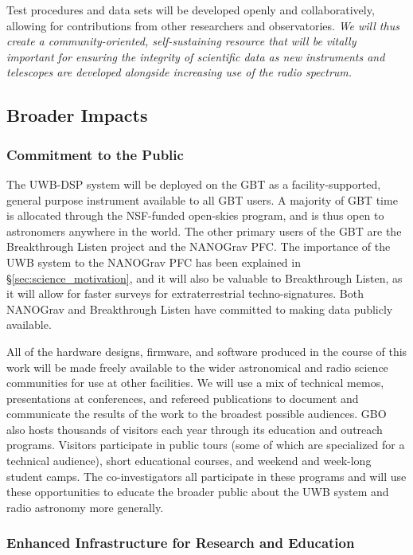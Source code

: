 \documentclass[10pt]{myNSF}
\begin{document}
Test procedures and data sets will be developed openly and
collaboratively, allowing for contributions from other researchers and
observatories.  \emph{We will thus create a community-oriented,
  self-sustaining resource that will be vitally important for ensuring
  the integrity of scientific data as new instruments and telescopes
  are developed alongside increasing use of the radio spectrum.}

\subsection{Broader Impacts}
\label{sec:BI}

\subsubsection{Commitment to the Public}
\label{sec:commitment}

The UWB-DSP system will be deployed on the GBT as a
facility-supported, general purpose instrument available to all GBT
users.  A majority of GBT time is allocated through the NSF-funded
open-skies program, and is thus open to astronomers anywhere in the
world.  The other primary users of the GBT are the Breakthrough Listen
project and the NANOGrav PFC.  The importance of the UWB system to the
NANOGrav PFC has been explained in \S\ref{sec:science_motivation}, and
it will also be valuable to Breakthrough Listen, as it will allow for
faster surveys for extraterrestrial techno-signatures.  Both NANOGrav
and Breakthrough Listen have committed to making data publicly
available.

All of the hardware designs, firmware, and software produced in the
course of this work will be made freely available to the wider
astronomical and radio science communities for use at other
facilities.  We will use a mix of technical memos, presentations at
conferences, and refereed publications to document and communicate the
results of the work to the broadest possible audiences.  GBO also
hosts thousands of visitors each year through its education and
outreach programs.  Visitors participate in public tours (some of
which are specialized for a technical audience), short educational
courses, and weekend and week-long student camps.  The
co-investigators all participate in these programs and will use these
opportunities to educate the broader public about the UWB system and
radio astronomy more generally.

\subsubsection{Enhanced Infrastructure for Research and Education}
\label{sec:infrastructure}
\end{document}
